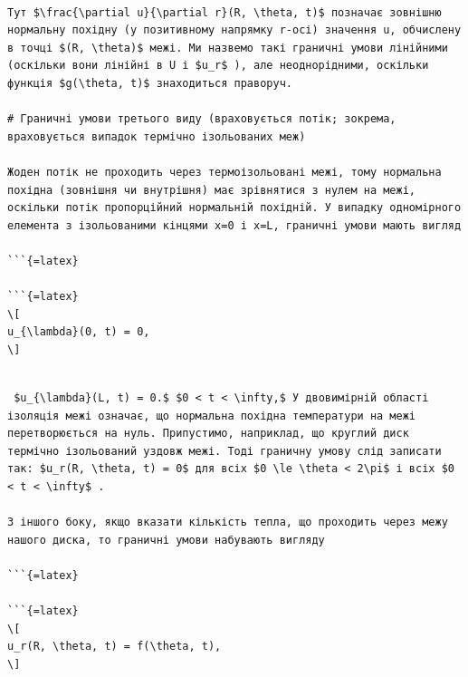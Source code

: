 \documentclass[
  ukrainian,
]{article}
\begin{document}
\begin{verbatim}

Тут $\frac{\partial u}{\partial r}(R, \theta, t)$ позначає зовнішню нормальну похідну (у позитивному напрямку r-осі) значення u, обчислену в точці $(R, \theta)$ межі. Ми назвемо такі граничні умови лінійними (оскільки вони лінійні в U і $u_r$ ), але неоднорідними, оскільки функція $g(\theta, t)$ знаходиться праворуч.

# Граничні умови третього виду (враховується потік; зокрема, враховується випадок термічно ізольованих меж)

Жоден потік не проходить через термоізольовані межі, тому нормальна похідна (зовнішня чи внутрішня) має зрівнятися з нулем на межі, оскільки потік пропорційний нормальній похідній. У випадку одномірного елемента з ізольованими кінцями x=0 і x=L, граничні умови мають вигляд

```{=latex}

```{=latex}
\[
u_{\lambda}(0, t) = 0,
\]
\end{verbatim}

\begin{verbatim}

 $u_{\lambda}(L, t) = 0.$ $0 < t < \infty,$ У двовимірній області ізоляція межі означає, що нормальна похідна температури на межі перетворюється на нуль. Припустимо, наприклад, що круглий диск термічно ізольований уздовж межі. Тоді граничну умову слід записати так: $u_r(R, \theta, t) = 0$ для всіх $0 \le \theta < 2\pi$ і всіх $0 < t < \infty$ .

З іншого боку, якщо вказати кількість тепла, що проходить через межу нашого диска, то граничні умови набувають вигляду

```{=latex}

```{=latex}
\[
u_r(R, \theta, t) = f(\theta, t),
\]
\end{verbatim}
\end{document}

